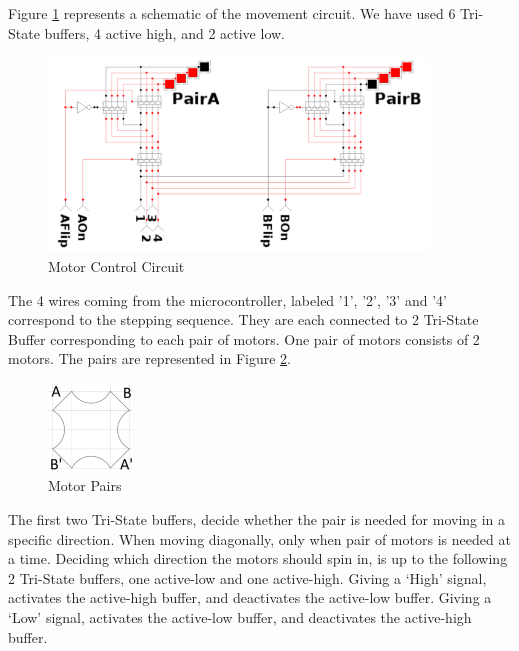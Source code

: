 Figure \ref{fig:mot_ctrl} represents a schematic of the movement circuit. We have used 6 Tri-State 
buffers, 4 active high, and 2 active low. 
\begin{figure}[htp]
	\centering
	\includegraphics[width=0.9\textwidth]{figures/move/direction_choice}
	\caption{Motor Control Circuit}
	\label{fig:mot_ctrl}
\end{figure}

The 4 wires coming from the microcontroller, labeled '1', '2', '3' and '4' correspond to the stepping sequence.
They are each connected to 2 Tri-State Buffer corresponding to each pair of motors. One pair of motors consists 
of 2 motors. The pairs are represented in Figure \ref{fig:motor_pairs_location}.

\begin{figure}[htp]
	\centering
	\includegraphics[width=0.2\textwidth]{figures/move/Motor_pairs_location.jpg}
	\caption{Motor Pairs}
	\label{fig:motor_pairs_location}
\end{figure}
\clearpage
The first two Tri-State buffers, decide whether the pair is needed for moving in a specific 
direction. When moving diagonally, only when pair of motors is needed at a time. Deciding 
which direction the motors should spin in, is up to the following 2 Tri-State buffers, 
one active-low and one active-high. Giving a ‘High’ signal, activates the active-high 
buffer, and deactivates the active-low buffer. Giving a ‘Low’ signal, activates the 
active-low buffer, and deactivates the active-high buffer. 

